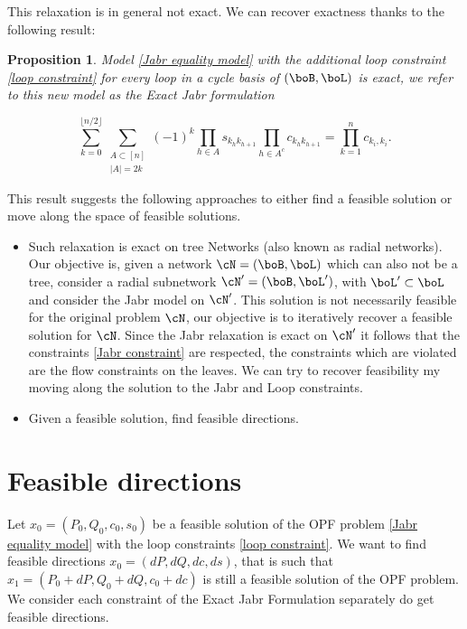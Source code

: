 \documentclass[11pt,a4paper,oneside,openany]{book}
\newtheorem{prop}[theorem]{Proposition}
\numberwithin{definition}{section}
\numberwithin{theorem}{section}
\numberwithin{problem}{section}
\begin{document}
This relaxation is in general not exact. We can recover exactness thanks to the following result:
\begin{prop}
  Model \eqref{Jabr equality model} with the additional \emph{loop constraint} \eqref{loop constraint} for every loop in a cycle basis of \((\boB,\boL)\) is exact, we refer to this new model as the \emph{Exact Jabr formulation}

  \begin{equation}
    \label{loop constraint}
    \sum_{k = 0}^{\lfloor n/2 \rfloor}\sum_{\substack{A \subset [n]\\|A|=2k}}(-1)^k\prod_{h \in A}s_{k_hk_{h+1}}\prod_{h \in A^c}c_{k_hk_{h+1}}=\prod_{k=1}^nc_{k_i,k_i}.
  \end{equation}
  \end{prop}
This result suggests the following approaches to either find a feasible solution or move along the space of feasible solutions.
\begin{itemize}
  \item Such relaxation is exact on tree Networks (also known as radial networks). Our objective is, given a network \(\cN = (\boB,\boL)\) which can also not be a tree, consider a radial subnetwork \(\cN' = (\boB,\boL')\), with \(\boL' \subset \boL \) and consider the Jabr model  on \(\cN'\).
  This solution is not necessarily feasible for the original problem \(\cN\), our objective is to iteratively recover a feasible solution for \(\cN\). 
  \vspace{1cm}
  Since the Jabr relaxation is exact on \(\cN'\) it follows that the constraints \ref{Jabr constraint} are respected, the constraints which are violated are the flow constraints on the leaves. We can try to recover feasibility my moving along the solution to the Jabr and Loop constraints.
  \item Given a feasible solution, find feasible directions.
\end{itemize}

\section{Feasible directions}

Let \(x_0 = (P_0,Q_0,c_0,s_0)\) be a feasible solution of the OPF problem \eqref{Jabr equality model} with the loop constraints \eqref{loop constraint}.
We want to find feasible directions \(x_0 = (dP,dQ,dc,ds)\), that is such that \(x_1 = (P_0+dP,Q_0+dQ,c_0+dc)\) is still a feasible solution of the OPF problem.
We consider each constraint of the Exact Jabr Formulation separately do get feasible directions.
\end{document}
